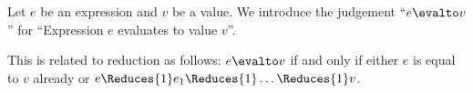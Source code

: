 \begin{node}\label{sml-0007}%
Let $e$ be an expression and $v$ be a value. We introduce the judgement
``$e\evalto v$'' for ``Expression $e$ evaluates to value $v$''. 

This is related to reduction as follows: $e\evalto v$ if and only if either
$e$ is equal to $v$ already or $e\Reduces{1}e_{1}\Reduces{1}\dots\Reduces{1}v$.
\end{node}

